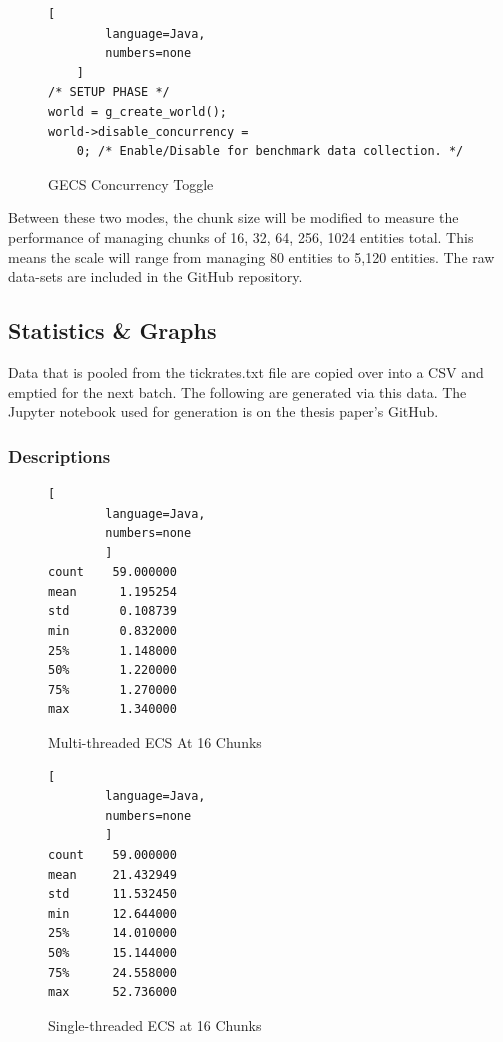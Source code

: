 \begin{figure}[htbp]
    \begin{lstlisting}[
        language=Java,
        numbers=none
    ]
/* SETUP PHASE */
world = g_create_world();
world->disable_concurrency =
    0; /* Enable/Disable for benchmark data collection. */
\end{lstlisting}
    \caption{GECS Concurrency Toggle}
    \label{code:toggler}
\end{figure}

Between these two modes, the chunk size will be modified to measure the performance of managing chunks of 16, 32, 64, 256, 1024 entities total. This means the scale will range from managing 80 entities to 5,120 entities.  The raw data-sets are included in the GitHub repository.

\subsection{Statistics \& Graphs}
Data that is pooled from the tickrates.txt file are copied over into a CSV and emptied for the next batch. The following are generated via this data. The Jupyter notebook used for generation is on the thesis paper's GitHub.

\subsubsection{Descriptions}
\begin{figure}[H]
    \centering
    \begin{minipage}{0.45\textwidth}
        \centering
        \begin{lstlisting}[
        language=Java,
        numbers=none
        ]
count    59.000000
mean      1.195254
std       0.108739
min       0.832000
25%       1.148000
50%       1.220000
75%       1.270000
max       1.340000
    \end{lstlisting}
        \caption{Multi-threaded ECS At 16 Chunks}
        \label{fig:figure1}
    \end{minipage}
    \hfill
    \begin{minipage}{0.45\textwidth}
        \centering
        \begin{lstlisting}[
        language=Java,
        numbers=none
        ]
count    59.000000
mean     21.432949
std      11.532450
min      12.644000
25%      14.010000
50%      15.144000
75%      24.558000
max      52.736000
    \end{lstlisting}
        \caption{Single-threaded ECS at 16 Chunks}
        \label{fig:figure2}
    \end{minipage}
\end{figure}
\newpage
